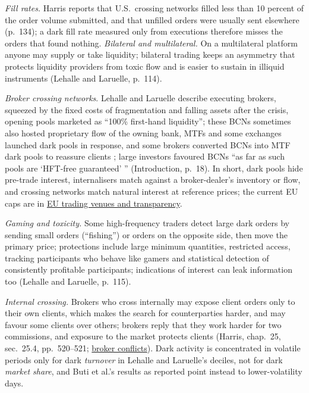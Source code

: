 \begin{qfdefinition}
\emph{Fill rates.} Harris reports that U.S.\ crossing networks filled less than 10 percent of the order volume submitted, and that unfilled orders were usually sent elsewhere (p.~134); a dark fill rate measured only from executions therefore misses the orders that found nothing. \emph{Bilateral and multilateral.} On a multilateral platform anyone may supply or take liquidity; bilateral trading keeps an asymmetry that protects liquidity providers from toxic flow and is easier to sustain in illiquid instruments (Lehalle and Laruelle, p.~114).

\emph{Broker crossing networks}. Lehalle and Laruelle describe executing brokers, squeezed by the fixed costs of fragmentation and falling assets after the crisis, opening pools marketed as ``100\% first-hand liquidity''; these BCNs sometimes also hosted proprietary flow of the owning bank, MTFs and some exchanges launched dark pools in response, and some brokers converted BCNs into MTF dark pools to reassure clients \citep[chap.~1, sec.~1.1.4, pp.~55--56]{alpha-laruelle}; large investors favoured BCNs ``as far as such pools are `HFT-free guaranteed' '' (Introduction, p.~18). In short, dark pools hide pre-trade interest, internalisers match against a broker-dealer's inventory or flow, and crossing networks match natural interest at reference prices; the current EU caps are in \hyperref[rule:eu-trading-venue-transparency]{EU trading venues and transparency}.

 \emph{Gaming and toxicity.} Some high-frequency traders detect large dark orders by sending small orders (``fishing'') or orders on the opposite side, then move the primary price; protections include large minimum quantities, restricted access, tracking participants who behave like gamers and statistical detection of consistently profitable participants; indications of interest can leak information too (Lehalle and Laruelle, p.~115).

\emph{Internal crossing.} Brokers who cross internally may expose client orders only to their own clients, which makes the search for counterparties harder, and may favour some clients over others; brokers reply that they work harder for two commissions, and exposure to the market protects clients (Harris, chap.~25, sec.~25.4, pp.~520--521; \hyperref[def:broker-agency-conflicts]{broker conflicts}). Dark activity is concentrated in volatile periods only for dark \emph{turnover} in Lehalle and Laruelle's deciles, not for dark \emph{market share}, and Buti et al.'s results as reported point instead to lower-volatility days.


\end{qfdefinition}
